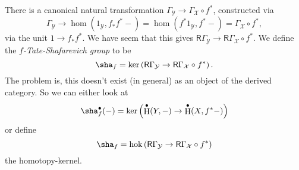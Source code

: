 \documentclass{amsart}
\DeclareMathOperator{\h}{H}
\DeclareMathOperator{\hoker}{hok}
\newcommand{\cX}{\mathcal{X}}
\newcommand{\cY}{\mathcal{Y}}
\newcommand{\eR}{\mathsf{R}}
\begin{document}
There is a canonical natural transformation 
$\Gamma_\cY \to \Gamma_\cX\circ f^\ast$, constructed via 
\[
  \Gamma_\cY \to \hom(1_\cY,f_\ast f^\ast-) = \hom(f^\ast 1_\cY,f^\ast -) = \Gamma_\cX\circ f^\ast ,
\]
via the unit $1\to f_\ast f^\ast$. We have seem that this gives 
$\eR \Gamma_\cY \to \eR \Gamma_\cX \circ f^\ast$. We define the 
\emph{$f$-Tate-Shafarevich group} to be 
\[
  \sha_f = \ker\left(\eR\Gamma_\cY \to \eR\Gamma_\cX\circ f^\ast\right) .
\]
The problem is, this doesn't exist (in general) as an object of the derived 
category. So we can either look at 
\[
  \sha_f^\bullet(-) = \ker\left(\h^\bullet(Y,-) \to \h^\bullet(X,f^\ast -)\right)
\]
or define 
\[
  \sha_f = \hoker\left(\eR\Gamma_\cY \to \eR\Gamma_\cX\circ f^\ast\right)
\]
the homotopy-kernel. 







\end{document}
